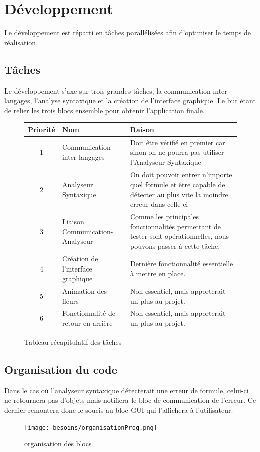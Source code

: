 \section{Développement}

Le développement est réparti en tâches parallélisées afin d'optimiser le temps de réalisation.

\subsection{Tâches}

Le développement s'axe sur trois grandes tâches, la communication inter langages, l'analyse syntaxique et la création de l'interface graphique. Le but étant de relier les trois blocs ensemble pour obtenir l'application finale.

\begin{figure}[!h]
\begin{center}
\begin{tabularx}{17cm}{|c|p{6cm}|X|}
  \hline
  Priorité & Nom & Raison\\
  \hline
  1 & Communication inter langages & Doit être vérifié en premier car sinon on ne pourra pas utiliser l'Analyseur Syntaxique \tabularnewline
  2 & Analyseur Syntaxique & On doit pouvoir entrer n'importe quel formule et être capable de détecter au plus vite la moindre erreur dans celle-ci \tabularnewline
  3 & Liaison Communication-Analyseur & Comme les principales fonctionnalités permettant de tester sont opérationnelles, nous pouvons passer à cette tâche. \tabularnewline
  4 & Création de l'interface graphique & Dernière fonctionnalité essentielle à mettre en place. \tabularnewline
  5 & Animation des fleurs & Non-essentiel, mais apporterait un plus au projet. \tabularnewline
  6 & Fonctionnalité de retour en arrière & Non-essentiel, mais apporterait un plus au projet. \tabularnewline
  \hline
\end{tabularx}
\end{center}
\caption{Tableau récapitulatif des tâches}
\end{figure}

\subsection{Organisation du code}

Dans le cas où l'analyseur syntaxique détecterait une erreur de formule, celui-ci ne retournera pas d'objets mais notifiera le bloc de communication de l'erreur. Ce dernier remontera donc le soucis au bloc GUI qui l'affichera à l'utilisateur.

\begin{figure}[!h]
\begin{center}
\texttt{[image: besoins/organisationProg.png]}
\end{center}
\caption{organisation des blocs}
\end{figure}
